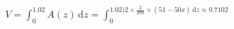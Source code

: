 \documentclass[preview]{standalone}
\begin{document}
\begin{align*}
V = \int_0^{1.02} \! A(z) \, \mathrm{d}z = \int_0^{1.02) \! 2 \times \frac{2}{293} \times (51 - 50x) \, \mathrm{d}z \approx 0.7102}
\end{align*}
\end{document}
